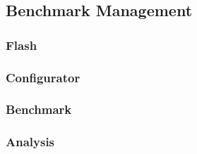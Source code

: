 \subsection{Benchmark Management}\label{subsec:Benchmark Management}

\subsubsection{Flash}\label{subsubsec:Flash}

\subsubsection{Configurator}\label{subsubsec:Configurator}

\subsubsection{Benchmark}\label{subsubsec:Benchmark}

\subsubsection{Analysis}\label{subsubsec:Analysis}

